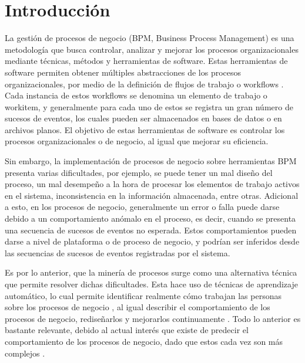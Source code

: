 
\chapter*{Introducción} 

La gestión de procesos de negocio (BPM, Business Process Management) es una metodología que busca controlar, analizar y mejorar los procesos organizacionales mediante técnicas, métodos y herramientas de software. Estas herramientas de software permiten obtener múltiples abstracciones de los procesos organizacionales, por medio de la definición de flujos de trabajo o workflows \cite{VanderAalst2004}. Cada instancia de estos workflows se denomina un elemento de trabajo o workitem, y generalmente para cada uno de estos se registra un gran número de sucesos de eventos, los cuales pueden ser almacenados en bases de datos o en archivos planos. El objetivo de estas herramientas de software es controlar los procesos organizacionales o de negocio, al igual que mejorar su eficiencia.

Sin embargo, la implementación de procesos de negocio sobre herramientas BPM presenta varias dificultades, por ejemplo, se puede tener un mal diseño del proceso, un mal desempeño a la hora de procesar los elementos de trabajo activos en el sistema, inconsistencia en la información almacenada, entre otras. Adicional a esto, en los procesos de negocio, generalmente un error o falla puede darse debido a un comportamiento anómalo en el proceso, es decir, cuando se presenta una secuencia de sucesos de eventos no esperada. Estos comportamientos pueden darse a nivel de plataforma o de proceso de negocio, y podrían ser inferidos desde las secuencias de sucesos de eventos registradas por el sistema. 

Es por lo anterior, que la minería de procesos surge como una alternativa técnica que permite resolver dichas dificultades. Esta hace uso de técnicas de aprendizaje automático, lo cual permite identificar realmente cómo trabajan las personas sobre los procesos de negocio \cite{VanDerAalst2004_2}, al igual describir el comportamiento de los procesos de negocio, rediseñarlos y mejorarlos continuamente \cite{VanderAalst2007}. Todo lo anterior es bastante relevante, debido al actual interés que existe de predecir el comportamiento de los procesos de negocio, dado que estos cada vez son más complejos \cite{Pandey2011}. 


